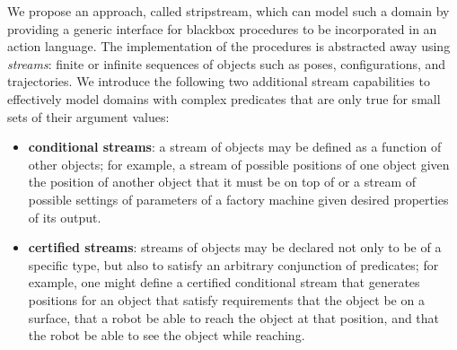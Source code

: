 \documentclass[letterpaper]{article} %
\theoremstyle{plain}\newtheorem{thm}{Theorem}
\theoremstyle{definition}\newtheorem{defn}{Definition}
\theoremstyle{plain}\newtheorem{lem}{Lemma}
\theoremstyle{plain}\newtheorem{cor}{Corollary}
\newcommand{\algname}{{\sc strips}tream}
\newcommand{\strips}{{\sc strips}}
\begin{document}
We propose an approach, called \algname{}, which can model such a
domain by providing a generic interface for blackbox procedures to be incorporated
in an action language. The implementation of the procedures is abstracted away using
{\em streams}: finite or infinite sequences of objects such as poses, configurations, and trajectories.
We introduce the following 
two additional stream capabilities to effectively model
domains with complex predicates that are only true for small sets 
of their argument values:
\begin{itemize}
\item {\bf conditional streams}:  a stream of objects may be defined
  as a function of other objects; for example, a stream of possible
  positions of one object given the position of another object that it
  must be on top of or a stream of possible settings of parameters of
  a factory machine given desired properties of its output.
\item {\bf certified streams}: streams of objects may be declared not
  only to be of a specific type, but also to satisfy an arbitrary
  conjunction of predicates;  for example, one might define a
  certified conditional stream that generates positions for an object
  that satisfy requirements that the object be on a surface, that a
  robot be able to reach the object at that position, and that the
  robot be able to see the object while reaching.   
\end{itemize}
\end{document}
